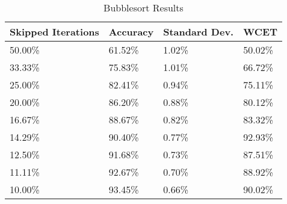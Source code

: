 \begin{table}[]
  \centering
  \caption{Bubblesort Results}
  \label{bubblesortT}
  \begin{tabular}{|l|l|l|l|}
    \hline
    \textbf{Skipped Iterations} & \textbf{Accuracy}  & \textbf{Standard Dev.}  & \textbf{WCET}           \\ \hline
50.00\% &  61.52\% &1.02\% &50.02\%   \\ \hline
33.33\% &  75.83\% &1.01\% &66.72\%   \\ \hline
25.00\% &  82.41\% &0.94\% &75.11\%   \\ \hline
20.00\% &  86.20\% &0.88\% &80.12\%   \\ \hline
16.67\% &  88.67\% &0.82\% &83.32\%   \\ \hline
14.29\% &  90.40\% &0.77\% &92.93\%   \\ \hline
12.50\% &  91.68\% &0.73\% &87.51\%   \\ \hline
11.11\% &  92.67\% &0.70\% &88.92\%   \\ \hline
10.00\% &  93.45\% &0.66\% &90.02\%   \\ \hline
  \end{tabular}
\end{table}
